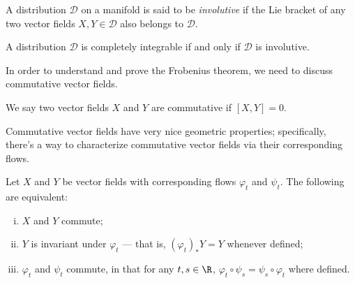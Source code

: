 \documentclass[10pt]{mypackage}
\begin{document}
\begin{definition}
  A distribution $\mathcal{D}$ on a manifold is said to be \textit{involutive} if the Lie bracket of any two vector fields $X,Y\in \mathcal{D}$ also belongs to $\mathcal{D}$.
\end{definition}
\begin{theorem}
  A distribution $\mathcal{D}$ is completely integrable if and only if $ \mathcal{D} $ is involutive.
\end{theorem}
In order to understand and prove the Frobenius theorem, we need to discuss commutative vector fields.
\begin{definition}
  We say two vector fields $X$ and $Y$ are commutative if $ \left[ X,Y \right] = 0$.
\end{definition}
Commutative vector fields have very nice geometric properties; specifically, there's a way to characterize commutative vector fields via their corresponding flows.
\begin{proposition}
  Let $X$ and $Y$ be vector fields with corresponding flows $\varphi_t$ and $\psi_t$. The following are equivalent:
  \begin{enumerate}[(i)]
    \item $X$ and $Y$ commute;
    \item $Y$ is invariant under $\varphi_t$ --- that is, $\left( \varphi_t \right)_{\ast}Y = Y$ whenever defined;
    \item $\varphi_t$ and $\psi_t$ commute, in that for any $t,s\in \R$, $\varphi_t\circ \psi_s = \psi_s\circ\varphi_t$ where defined.
  \end{enumerate}
\end{proposition}
\end{document}
